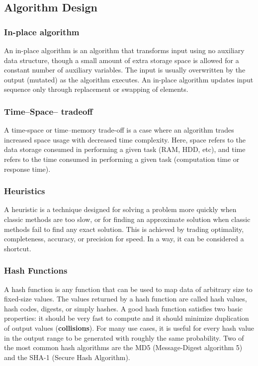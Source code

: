 \documentclass{article}
\begin{document}
    \subsection{Algorithm Design}
    \subsubsection{In-place algorithm}
        An in-place algorithm is an algorithm that transforms input using no auxiliary data structure, though a small amount of extra storage space is allowed for a constant number of auxiliary variables. The input is usually overwritten by the output (mutated) as the algorithm executes. An in-place algorithm updates input sequence only through replacement or swapping of elements.
        
    \subsubsection{Time--Space– tradeoff}
        A time-space or time–memory trade-off is a case where an algorithm trades increased space usage with decreased time complexity. Here, space refers to the data storage consumed in performing a given task (RAM, HDD, etc), and time refers to the time consumed in performing a given task (computation time or response time).
        
    \subsubsection{Heuristics}
        A heuristic is a technique designed for solving a problem more quickly when classic methods are too slow, or for finding an approximate solution when classic methods fail to find any exact solution. This is achieved by trading optimality, completeness, accuracy, or precision for speed. In a way, it can be considered a shortcut.
    
    \subsubsection{Hash Functions}
        A hash function is any function that can be used to map data of arbitrary size to fixed-size values. The values returned by a hash function are called hash values, hash codes, digests, or simply hashes. 
        A good hash function satisfies two basic properties: it should be very fast to compute and it should minimize duplication of output values (\textbf{collisions}). For many use cases, it is useful for every hash value in the output range to be generated with roughly the same probability. Two of the most common hash algorithms are the MD5 (Message-Digest algorithm 5) and the SHA-1 (Secure Hash Algorithm).
\end{document}
